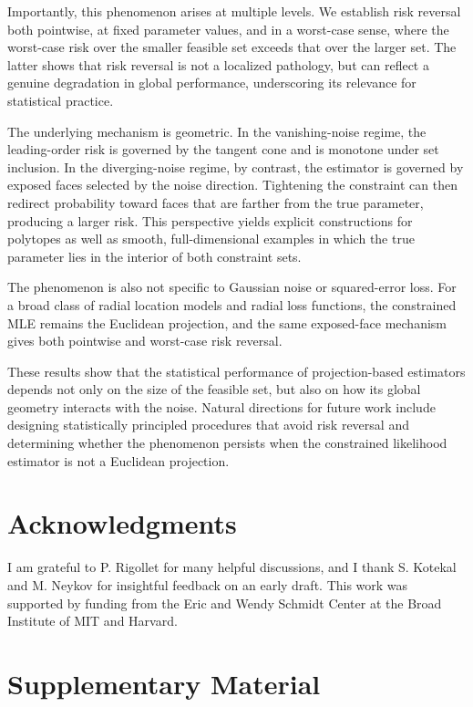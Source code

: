 \documentclass[11pt]{article}
\theoremstyle{plain}
\theoremstyle{definition}
\begin{document}
Importantly, this phenomenon arises at multiple levels. We establish risk reversal both pointwise, at fixed parameter values, and in a worst-case sense, where the worst-case risk over the smaller feasible set exceeds that over the larger set. The latter shows that risk reversal is not a localized pathology, but can reflect a genuine degradation in global performance, underscoring its relevance for statistical practice.

The underlying mechanism is geometric. In the vanishing-noise regime, the leading-order risk is governed by the tangent cone and is monotone under set inclusion. In the diverging-noise regime, by contrast, the estimator is governed by exposed faces selected by the noise direction. Tightening the constraint can then redirect probability toward faces that are farther from the true parameter, producing a larger risk. This perspective yields explicit constructions for polytopes as well as smooth, full-dimensional examples in which the true parameter lies in the interior of both constraint sets.

The phenomenon is also not specific to Gaussian noise or squared-error loss. For a broad class of radial location models and radial loss functions, the constrained MLE remains the Euclidean projection, and the same exposed-face mechanism gives both pointwise and worst-case risk reversal.

These results show that the statistical performance of projection-based estimators depends not only on the size of the feasible set, but also on how its global geometry interacts with the noise. Natural directions for future work include designing statistically principled procedures that avoid risk reversal and determining whether the phenomenon persists when the constrained likelihood estimator is not a Euclidean projection.



\section*{Acknowledgments}
I am grateful to P. Rigollet for many helpful discussions, and I thank S. Kotekal and M. Neykov for insightful feedback on an early draft. This work was supported by funding from the Eric and Wendy Schmidt Center at the Broad Institute of MIT and Harvard.


\appendix
\section*{Supplementary Material}
\end{document}
